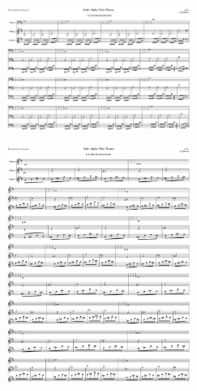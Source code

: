 \begin{figure}[H]                                             
{                                                             
  \setlength{\tabcolsep}{3.0pt}                               
  \setlength\cmidrulewidth{\heavyrulewidth} %
    \begin{subfigure}{0.5\textwidth}                            
  \includegraphics[width=6cm]{music/title_no_7_page_1001.png}%
    \end{subfigure}                                             
  \begin{subfigure}{0.5\textwidth}                            
  \includegraphics[width=6cm]{music/title_no_8_page_1001.png}%
    \end{subfigure}                                             
}                                                             
\end{figure}                                                  


